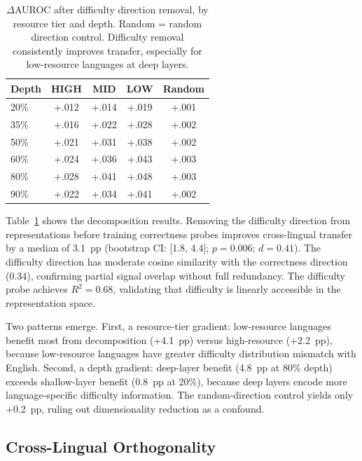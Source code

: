 \documentclass[11pt,a4paper]{article}
\begin{document}
\begin{table}[t]
\centering
\small
\begin{tabular}{@{}lcccc@{}}
\toprule
\textbf{Depth} & \textbf{HIGH} & \textbf{MID} & \textbf{LOW} & \textbf{Random} \\
\midrule
20\% & +.012 & +.014 & +.019 & +.001 \\
35\% & +.016 & +.022 & +.028 & +.002 \\
50\% & +.021 & +.031 & +.038 & +.002 \\
60\% & +.024 & +.036 & +.043 & +.003 \\
80\% & +.028 & +.041 & +.048 & +.003 \\
90\% & +.022 & +.034 & +.041 & +.002 \\
\bottomrule
\end{tabular}
\caption{$\Delta$AUROC after difficulty direction removal, by resource tier and depth. Random = random direction control. Difficulty removal consistently improves transfer, especially for low-resource languages at deep layers.}
\label{tab:decomp}
\end{table}

Table~\ref{tab:decomp} shows the decomposition results.
Removing the difficulty direction from representations before training correctness probes improves cross-lingual transfer by a median of 3.1~pp (bootstrap CI: [1.8, 4.4]; $p = 0.006$; $d = 0.41$).
The difficulty direction has moderate cosine similarity with the correctness direction (0.34), confirming partial signal overlap without full redundancy.
The difficulty probe achieves $R^2 = 0.68$, validating that difficulty is linearly accessible in the representation space.

Two patterns emerge.
First, a resource-tier gradient: low-resource languages benefit most from decomposition (+4.1~pp) versus high-resource (+2.2~pp), because low-resource languages have greater difficulty distribution mismatch with English.
Second, a depth gradient: deep-layer benefit (4.8~pp at 80\% depth) exceeds shallow-layer benefit (0.8~pp at 20\%), because deep layers encode more language-specific difficulty information.
The random-direction control yields only +0.2~pp, ruling out dimensionality reduction as a confound.

\subsection{Cross-Lingual Orthogonality}
\label{sec:exp:ortho}
\end{document}
